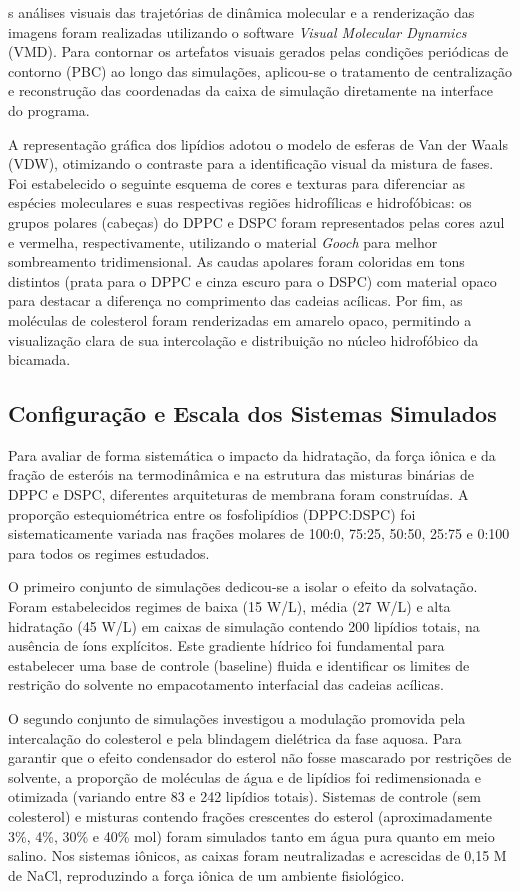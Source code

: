 \documentclass[12pt]{article} %
\begin{document}
s análises visuais das trajetórias de dinâmica molecular e a renderização das imagens foram realizadas utilizando o software \textit{Visual Molecular Dynamics} (VMD). Para contornar os artefatos visuais gerados pelas condições periódicas de contorno (PBC) ao longo das simulações, aplicou-se o tratamento de centralização e reconstrução das coordenadas da caixa de simulação diretamente na interface do programa.

A representação gráfica dos lipídios adotou o modelo de esferas de Van der Waals (VDW), otimizando o contraste para a identificação visual da mistura de fases. Foi estabelecido o seguinte esquema de cores e texturas para diferenciar as espécies moleculares e suas respectivas regiões hidrofílicas e hidrofóbicas: os grupos polares (cabeças) do DPPC e DSPC foram representados pelas cores azul e vermelha, respectivamente, utilizando o material \textit{Gooch} para melhor sombreamento tridimensional. As caudas apolares foram coloridas em tons distintos (prata para o DPPC e cinza escuro para o DSPC) com material opaco para destacar a diferença no comprimento das cadeias acílicas. Por fim, as moléculas de colesterol foram renderizadas em amarelo opaco, permitindo a visualização clara de sua intercolação e distribuição no núcleo hidrofóbico da bicamada.

\subsection{Configuração e Escala dos Sistemas Simulados}

Para avaliar de forma sistemática o impacto da hidratação, da força iônica e da fração de esteróis na termodinâmica e na estrutura das misturas binárias de DPPC e DSPC, diferentes arquiteturas de membrana foram construídas. A proporção estequiométrica entre os fosfolipídios (DPPC:DSPC) foi sistematicamente variada nas frações molares de 100:0, 75:25, 50:50, 25:75 e 0:100 para todos os regimes estudados.

O primeiro conjunto de simulações dedicou-se a isolar o efeito da solvatação. Foram estabelecidos regimes de baixa (15 W/L), média (27 W/L) e alta hidratação (45 W/L) em caixas de simulação contendo 200 lipídios totais, na ausência de íons explícitos. Este gradiente hídrico foi fundamental para estabelecer uma base de controle (baseline) fluida e identificar os limites de restrição do solvente no empacotamento interfacial das cadeias acílicas.

O segundo conjunto de simulações investigou a modulação promovida pela intercalação do colesterol e pela blindagem dielétrica da fase aquosa. Para garantir que o efeito condensador do esterol não fosse mascarado por restrições de solvente, a proporção de moléculas de água e de lipídios foi redimensionada e otimizada (variando entre 83 e 242 lipídios totais). Sistemas de controle (sem colesterol) e misturas contendo frações crescentes do esterol (aproximadamente 3\%, 4\%, 30\% e 40\% mol) foram simulados tanto em água pura quanto em meio salino. Nos sistemas iônicos, as caixas foram neutralizadas e acrescidas de 0,15 M de NaCl, reproduzindo a força iônica de um ambiente fisiológico.
\end{document}
